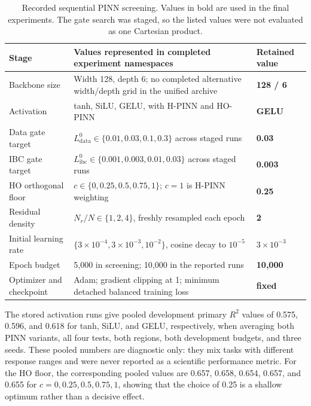 \begin{table}[!htbp]
\centering
\small
\setlength{\tabcolsep}{3pt}
\caption{Recorded sequential PINN screening. Values in bold are used in the final experiments. The gate search was staged, so the listed values were not evaluated as one Cartesian product.}
\label{tab:pinn_screen}
\begin{tabular}{p{}p{}p{}}
\toprule
Stage & Values represented in completed experiment namespaces & Retained value\\
\midrule
Backbone size & Width 128, depth 6; no completed alternative width/depth grid in the unified archive & \textbf{128 / 6}\\
Activation & tanh, SiLU, GELU, with H-PINN and HO-PINN & \textbf{GELU}\\
Data gate target & \(L^0_{\mathrm{data}}\in\{0.01,0.03,0.1,0.3\}\) across staged runs & \textbf{0.03}\\
IBC gate target & \(L^0_{\mathrm{ibc}}\in\{0.001,0.003,0.01,0.03\}\) across staged runs & \textbf{0.003}\\
HO orthogonal floor & \(c\in\{0,0.25,0.5,0.75,1\}\); \(c=1\) is H-PINN weighting & \textbf{0.25}\\
Residual density & \(N_r/N\in\{1,2,4\}\), freshly resampled each epoch & \textbf{2}\\
Initial learning rate & \(\{3\times10^{-4},3\times10^{-3},10^{-2}\}\), cosine decay to \(10^{-5}\) & \textbf{\(3\times10^{-3}\)}\\
Epoch budget & 5,000 in screening; 10,000 in the reported runs & \textbf{10,000}\\
Optimizer and checkpoint & Adam; gradient clipping at 1; minimum detached balanced training loss & \textbf{fixed}\\
\bottomrule
\end{tabular}
\end{table}

The stored activation runs give pooled development primary \(R^2\) values of 0.575, 0.596, and 0.618 for tanh, SiLU, and GELU, respectively, when averaging both PINN variants, all four tests, both regions, both development budgets, and three seeds. These pooled numbers are diagnostic only: they mix tasks with different response ranges and were never reported as a scientific performance metric. For the HO floor, the corresponding pooled values are 0.657, 0.658, 0.654, 0.657, and 0.655 for \(c=0,0.25,0.5,0.75,1\), showing that the choice of 0.25 is a shallow optimum rather than a decisive effect.

